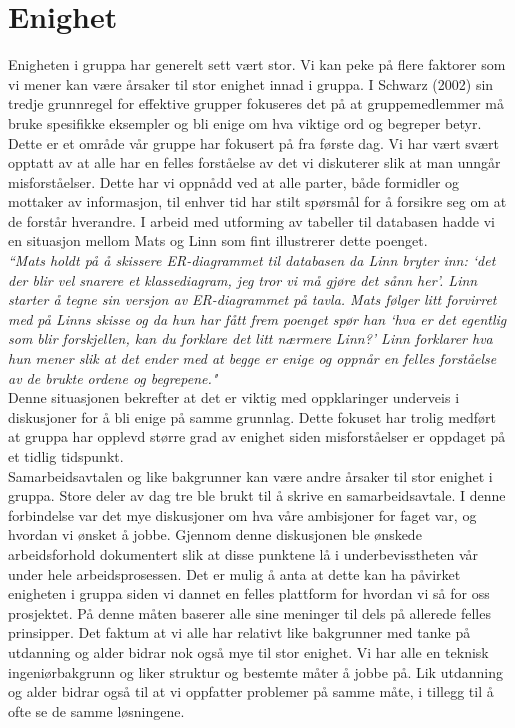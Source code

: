 \section{Enighet}
\label{sec:enighet}
Enigheten i gruppa har generelt sett vært stor. Vi kan peke på flere faktorer som vi mener kan være årsaker til stor enighet innad i gruppa. I Schwarz (2002) \cite{fasilitator} sin tredje grunnregel for effektive grupper fokuseres det på at gruppemedlemmer må bruke spesifikke eksempler og bli enige om hva viktige ord og begreper betyr. Dette er et område vår gruppe har fokusert på fra første dag. Vi har vært svært opptatt av at alle har en felles forståelse av det vi diskuterer slik at man unngår misforståelser. Dette har vi oppnådd ved at alle parter, både formidler og mottaker av informasjon, til enhver tid har stilt spørsmål for å forsikre seg om at de forstår hverandre. I arbeid med utforming av tabeller til databasen hadde vi en situasjon mellom Mats og Linn som fint illustrerer dette poenget.\\

\textit{``Mats holdt på å skissere ER-diagrammet til databasen da Linn bryter inn: `det der blir vel snarere et klassediagram, jeg tror vi må gjøre det sånn her'. Linn starter å tegne sin versjon av ER-diagrammet på tavla. Mats følger litt forvirret med på Linns skisse og da hun har fått frem poenget spør han `hva er det egentlig som blir forskjellen, kan du forklare det litt nærmere Linn?' Linn forklarer hva hun mener slik at det ender med at begge er enige og oppnår en felles forståelse av de brukte ordene og begrepene."}\\

Denne situasjonen bekrefter at det er viktig med oppklaringer underveis i diskusjoner for å bli enige på samme grunnlag. Dette fokuset har trolig medført at gruppa har opplevd større grad av enighet siden misforståelser er oppdaget på et tidlig tidspunkt.\\

Samarbeidsavtalen og like bakgrunner kan være andre årsaker til stor enighet i gruppa. Store deler av dag tre ble brukt til å skrive en samarbeidsavtale. I denne forbindelse var det mye diskusjoner om hva våre ambisjoner for faget var, og hvordan vi ønsket å jobbe. Gjennom denne diskusjonen ble ønskede arbeidsforhold dokumentert slik at disse punktene lå i underbevisstheten vår under hele arbeidsprosessen. Det er mulig å anta at dette kan ha påvirket enigheten i gruppa siden vi dannet en felles plattform for hvordan vi så for oss prosjektet. På denne måten baserer alle sine meninger til dels på allerede felles prinsipper. Det faktum at vi alle har relativt like bakgrunner med tanke på utdanning og alder bidrar nok også mye til stor enighet. Vi har alle en teknisk ingeniørbakgrunn og liker struktur og bestemte måter å jobbe på. Lik utdanning og alder bidrar også til at vi oppfatter problemer på samme måte, i tillegg til å ofte se de samme løsningene.\\

